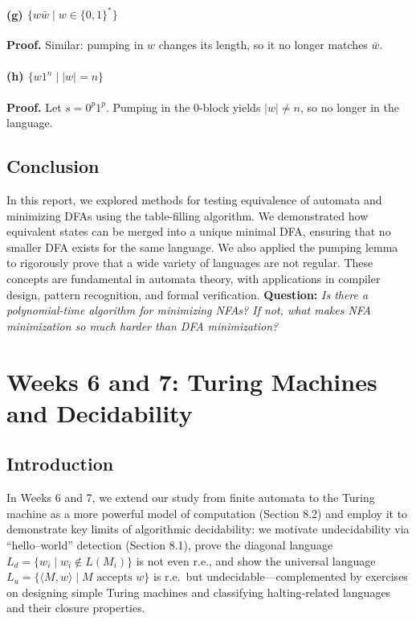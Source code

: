 \documentclass{article}
\theoremstyle{theorem}
\theoremstyle{definition}
\theoremstyle{remark}
\begin{document}
\paragraph{(g) \(\{w\bar w\mid w\in\{0,1\}^*\}\)}
\textbf{Proof.} Similar: pumping in \(w\) changes its length, so it no longer matches \(\bar w\).

\paragraph{(h) \(\{w1^n\mid |w|=n\}\)}
\textbf{Proof.} Let \(s=0^p1^p\). Pumping in the 0-block yields \(|w|\neq n\), so no longer in the language.


\subsection{Conclusion}
In this report, we explored methods for testing equivalence of automata and minimizing DFAs using the table-filling algorithm. We demonstrated how equivalent states can be merged into a unique minimal DFA, ensuring that no smaller DFA exists for the same language. We also applied the pumping lemma to rigorously prove that a wide variety of languages are not regular. These concepts are fundamental in automata theory, with applications in compiler design, pattern recognition, and formal verification.
\textbf{Question:}  
\emph{Is there a polynomial-time algorithm for minimizing NFAs? If not, what makes NFA minimization so much harder than DFA minimization?}

\newpage

\section{Weeks 6 and 7: Turing Machines and Decidability}

\subsection{Introduction}
In Weeks 6 and 7, we extend our study from finite automata to the Turing machine as a more powerful model of computation (Section 8.2) and employ it to demonstrate key limits of algorithmic decidability: we motivate undecidability via “hello–world” detection (Section 8.1), prove the diagonal language \(L_{d}=\{w_i\mid w_i\notin L(M_i)\}\) is not even r.e., and show the universal language \(L_{u}=\{\langle M,w\rangle\mid M\text{ accepts }w\}\) is r.e.\ but undecidable—complemented by exercises on designing simple Turing machines and classifying halting‐related languages and their closure properties.
\end{document}
